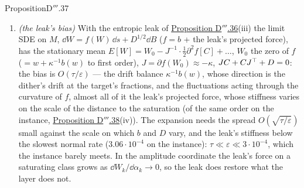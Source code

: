 \begin{thm}{Proposition}{D$'''$.37}
\begin{enumerate}[label=\textup{(\roman*)}]
    ($\Gamma_{kk} = \langle\varphi_k^2\rangle_\rho$), which falls below the mass channel's
    $\gamma a_k^2W_k\Gamma_{kk}\approx\gamma a_{\max}\abs{A_k}\Gamma_{kk}$ within
    $\delta^* := \frac12\sqrt{\gamma a_{\max}\abs{A_k}/(mG_\alpha)} = O(\sqrt\gamma)$ of the saturation. Inside that
    layer the residual relaxes through the masses, the amplitude diffuses freely along $M$ with the mass slaved to it
    ($W_k = A_k/a(\alpha_k)$), and the drift tends to the It\^o term of this convex map,
    \[
      b_k\to\tau G_\alpha\partial^2_\alpha\big(A_k/a(\alpha_k)\big) > 0\qquad
      (W_k - \abs{A_k}/a_{\max}\ll\delta^*):
    \]
    the drift of $W_k$ turns outward and has a zero at a fixed fraction of $\delta^*$, but it is only the It\^o term of
    a driftless diffusion of $\alpha_k$, with the diffusion $2\tau G_\alpha$: in the amplitude coordinate nothing
    restores, the zero-flux density in $W_k$ $\propto1/(W_k - \abs{A_k}/a_{\max})$ is not normalisable, and the
    excursions into the saturation grow (null recurrence in $\alpha_k$). The attracting zeros of the mean drift are
    therefore not states the masses settle in; without a leak the masses' law drifts into the saturations. Within
    about $0.1\delta^*$ of a saturation the transverse mass fluctuations are as large as the distance itself, and the
    description in the coordinates $W$ breaks down.
  \item \emph{(the leak's bias)} With the entropic leak of \hyperref[res:thmDppp:36]{Proposition D$'''$.36}(iii) the
    limit SDE on $M$, $\dd W = f(W)\,\dd s + D^{1/2}\dd B$ ($f = b$ + the leak's projected force), has the stationary
    mean $E[W] = W_0 - J^{-1}\cdot\tfrac12\partial^2f[C] + \dots$, $W_0$ the zero of $f$ ($= w + \kappa^{-1}b(w)$ to
    first order), $J = \partial f(W_0)\approx-\kappa$, $JC + CJ^\top + D = 0$: the bias is $O(\tau/\varepsilon)$ --- the
    drift balance $\kappa^{-1}b(w)$, whose direction is the dither's drift at the target's fractions, and the
    fluctuations acting through the curvature of $f$, almost all of it the leak's projected force, whose stiffness
    varies on the scale of the distance to the saturation (of the same order on the instance,
    \hyperref[res:thmDppp:38]{Proposition D$'''$.38}(iv)). The expansion needs the spread $O(\sqrt{\tau/\varepsilon})$
    small against the scale on which $b$ and $D$ vary, and the leak's stiffness below the slowest normal rate
    ($3.06\cdot10^{-4}$ on the instance): $\tau\ll\varepsilon\ll3\cdot10^{-4}$, which the instance barely meets. In the amplitude coordinate the leak's force on a saturating class grows as
    $\dd W_k/\dd\alpha_k\to0$, so the leak does restore what the layer does not.
\end{enumerate}
\end{thm}

